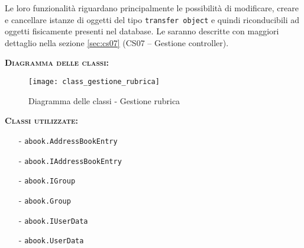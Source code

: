 \begin{description}
Le loro funzionalità riguardano principalmente le possibilità di modificare, creare e cancellare istanze di oggetti del tipo \texttt{transfer object} e quindi riconducibili ad oggetti fisicamente presenti nel database. Le  saranno descritte con maggiori dettaglio nella sezione \vref{sec:cs07} (\textsf{CS07 -- Gestione controller}).

	\item{\scshape\bfseries Diagramma delle classi:}
\begin{figure}[H]
  \centering
  \texttt{[image: class\_gestione\_rubrica]}
  \caption{Diagramma delle classi - Gestione rubrica}\label{fig:gestionerubrica}
\end{figure}
	
	\item{\scshape\bfseries Classi utilizzate:}\\
	\begin{itemize}[nolistsep, noitemsep]
	  \item[-] \texttt{abook.AddressBookEntry}
	  \item[-] \texttt{abook.IAddressBookEntry}
	  \item[-] \texttt{abook.IGroup}
	  \item[-] \texttt{abook.Group}
	  \item[-] \texttt{abook.IUserData}
	  \item[-] \texttt{abook.UserData}
	\end{itemize}
\end{description}


